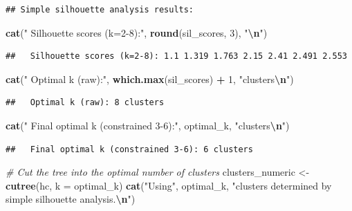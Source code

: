 \documentclass[
]{article}
\newenvironment{Shaded}{\begin{snugshade}}{\end{snugshade}}
\newcommand{\AttributeTok}[1]{\textcolor[rgb]{0.13,0.29,0.53}{#1}}
\newcommand{\CommentTok}[1]{\textcolor[rgb]{0.56,0.35,0.01}{\textit{#1}}}
\newcommand{\DecValTok}[1]{\textcolor[rgb]{0.00,0.00,0.81}{#1}}
\newcommand{\FunctionTok}[1]{\textcolor[rgb]{0.13,0.29,0.53}{\textbf{#1}}}
\newcommand{\NormalTok}[1]{#1}
\newcommand{\OtherTok}[1]{\textcolor[rgb]{0.56,0.35,0.01}{#1}}
\newcommand{\SpecialCharTok}[1]{\textcolor[rgb]{0.81,0.36,0.00}{\textbf{#1}}}
\newcommand{\StringTok}[1]{\textcolor[rgb]{0.31,0.60,0.02}{#1}}
\begin{document}
\begin{verbatim}
## Simple silhouette analysis results:
\end{verbatim}

\begin{Shaded}
\begin{Highlighting}[]
\FunctionTok{cat}\NormalTok{(}\StringTok{"  Silhouette scores (k=2{-}8):"}\NormalTok{, }\FunctionTok{round}\NormalTok{(sil\_scores, }\DecValTok{3}\NormalTok{), }\StringTok{"}\SpecialCharTok{\textbackslash{}n}\StringTok{"}\NormalTok{)}
\end{Highlighting}
\end{Shaded}

\begin{verbatim}
##   Silhouette scores (k=2-8): 1.1 1.319 1.763 2.15 2.41 2.491 2.553
\end{verbatim}

\begin{Shaded}
\begin{Highlighting}[]
\FunctionTok{cat}\NormalTok{(}\StringTok{"  Optimal k (raw):"}\NormalTok{, }\FunctionTok{which.max}\NormalTok{(sil\_scores) }\SpecialCharTok{+} \DecValTok{1}\NormalTok{, }\StringTok{"clusters}\SpecialCharTok{\textbackslash{}n}\StringTok{"}\NormalTok{)}
\end{Highlighting}
\end{Shaded}

\begin{verbatim}
##   Optimal k (raw): 8 clusters
\end{verbatim}

\begin{Shaded}
\begin{Highlighting}[]
\FunctionTok{cat}\NormalTok{(}\StringTok{"  Final optimal k (constrained 3{-}6):"}\NormalTok{, optimal\_k, }\StringTok{"clusters}\SpecialCharTok{\textbackslash{}n}\StringTok{"}\NormalTok{)}
\end{Highlighting}
\end{Shaded}

\begin{verbatim}
##   Final optimal k (constrained 3-6): 6 clusters
\end{verbatim}

\begin{Shaded}
\begin{Highlighting}[]
\CommentTok{\# Cut the tree into the optimal number of clusters}
\NormalTok{clusters\_numeric }\OtherTok{\textless{}{-}} \FunctionTok{cutree}\NormalTok{(hc, }\AttributeTok{k =}\NormalTok{ optimal\_k)}
\FunctionTok{cat}\NormalTok{(}\StringTok{"Using"}\NormalTok{, optimal\_k, }\StringTok{"clusters determined by simple silhouette analysis.}\SpecialCharTok{\textbackslash{}n}\StringTok{"}\NormalTok{)}
\end{Highlighting}
\end{Shaded}
\end{document}
